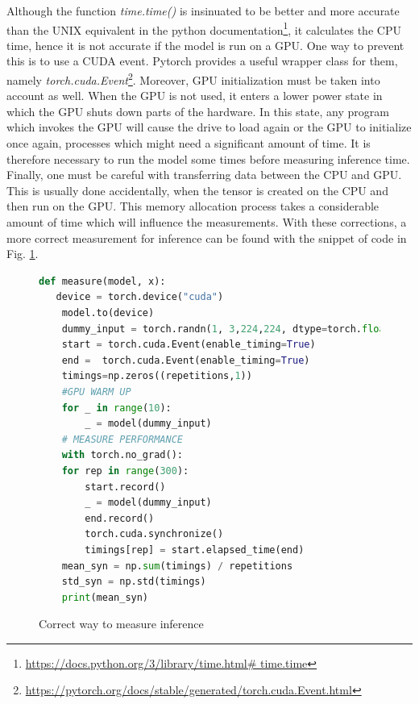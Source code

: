 Although the function \textit{time.time()} is insinuated to be better and more accurate than the UNIX equivalent in the python documentation\footnote{ \url{https://docs.python.org/3/library/time.html\# time.time} }, it calculates the CPU time, hence it is not accurate if the model is run on a GPU. One way to prevent this is to use a CUDA event. Pytorch provides a useful wrapper class for them, namely \textit{torch.cuda.Event}\footnote{ \url{https://pytorch.org/docs/stable/generated/torch.cuda.Event.html} }. Moreover, GPU initialization must be taken into account as well. When the GPU is not used, it enters a lower power state in which the GPU shuts down parts of the hardware. In this state, any program which invokes the GPU will cause the drive to load again or the GPU to initialize once again, processes which might need a significant amount of time. It is therefore necessary to run the model some times before measuring inference time. \cite{Correct_inference_measure}
Finally, one must be careful with transferring data between the CPU and GPU. This is usually done accidentally, when the tensor is created on the CPU and then run on the GPU. This memory allocation process takes a considerable amount of time which will influence the measurements. \cite{Correct_inference_measure}
With these corrections, a more correct measurement for inference can be found with the snippet of code in Fig. \ref{fig:corr_inf}.\\
\begin{figure}[h]
\begin{lstlisting}[language=python]
def measure(model, x):
   device = torch.device("cuda")
    model.to(device)
    dummy_input = torch.randn(1, 3,224,224, dtype=torch.float).to(device)
    start = torch.cuda.Event(enable_timing=True)
    end =  torch.cuda.Event(enable_timing=True)
    timings=np.zeros((repetitions,1))
    #GPU WARM UP
    for _ in range(10):
        _ = model(dummy_input)
    # MEASURE PERFORMANCE
    with torch.no_grad():
    for rep in range(300):
        start.record()
        _ = model(dummy_input)
        end.record()
        torch.cuda.synchronize()
        timings[rep] = start.elapsed_time(end)
    mean_syn = np.sum(timings) / repetitions
    std_syn = np.std(timings)
    print(mean_syn)

\end{lstlisting}
\caption{Correct way to measure inference}
\label{fig:corr_inf}
\end{figure}


